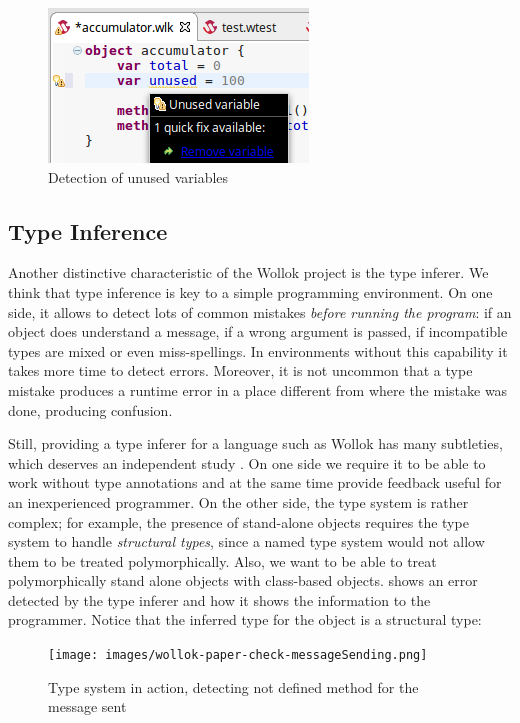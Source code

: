 \begin{figure}[ht]
    \centering
	\includegraphics[scale=0.5]{images/wollok-paper-check-unusedVariable.png}
    \caption{Detection of unused variables}
    \label{fig:check-unusedVariable.png}
\end{figure}

\subsection{Type Inference}
Another distinctive characteristic of the Wollok project is the type inferer.
We think that type inference is key to a simple programming environment.
On one side, it allows to detect lots of common mistakes \emph{before running the program}:
if an object does understand a message, if a wrong argument is passed, if incompatible types are mixed or even miss-spellings.
In environments without this capability it takes more time to detect errors.
Moreover, it is not uncommon that a type mistake produces a runtime error in a place different from where the mistake was done, producing confusion.

Still, providing a type inferer for a language such as Wollok has many subtleties, which deserves an independent study \cite{passerini_nicolas_extensible_2014}.
On one side we require it to be able to work without type annotations and at the same time provide feedback useful for an inexperienced programmer.
On the other side, the type system is rather complex;
for example, the presence of stand-alone objects requires the type system to handle \emph{structural types}, since a named type system would not allow them to be treated polymorphically.
Also, we want to be able to treat polymorphically stand alone objects with class-based objects.
 shows an error detected by the type inferer and how it shows the information to the programmer.
Notice that the inferred type for the object  is a structural type: 

\begin{figure}[ht]
    \centering
	\texttt{[image: images/wollok-paper-check-messageSending.png]}
    \caption{Type system in action, detecting not defined method for the message sent}
    \label{fig:check-messageSending.png}
\end{figure}

